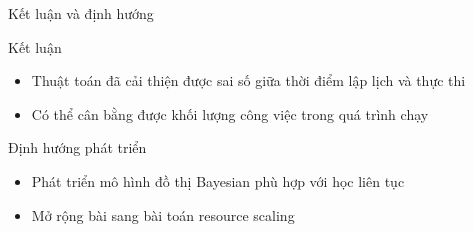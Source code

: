 \documentclass[11pt,xcolor={dvipsnames}, aspectratio=169]{beamer}
\begin{document}
\begin{frame}
{Kết luận và định hướng}

\begin{block}
{Kết luận}
	\begin{itemize}
		\item Thuật toán đã cải thiện được sai số giữa thời điểm lập lịch và thực thi
		\item Có thể cân bằng được khối lượng công việc trong quá trình chạy 
	\end{itemize}
\end{block}

\pause
\begin{block}
{Định hướng phát triển}
\begin{itemize}
	\item Phát triển mô hình đồ thị Bayesian phù hợp với học liên tục 
	\item Mở rộng bài sang bài toán resource scaling
\end{itemize}
\end{block}
\end{frame}

{\1
\begin{frame}
\end{frame}}
\end{document}
